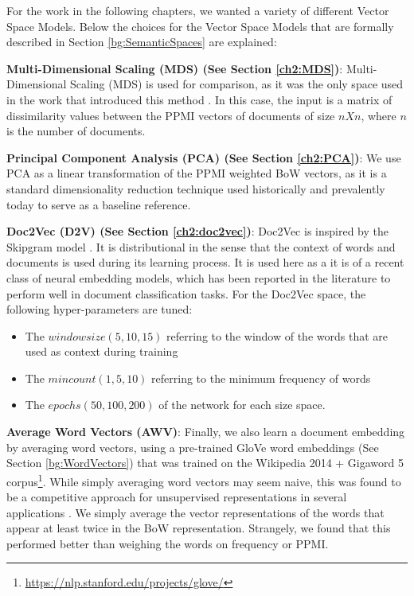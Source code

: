 For the work in the following chapters, we wanted a variety of different Vector Space Models. Below the choices for the Vector Space Models that are formally described in Section \ref{bg:SemanticSpaces} are explained:

\textbf{Multi-Dimensional Scaling (MDS) (See Section \ref{ch2:MDS})}:  Multi-Dimensional Scaling (MDS) is used for comparison, as it was the only space used in the work that introduced this method \cite{derracAIJ}. In this case, the input is a matrix of dissimilarity values between the PPMI vectors of documents of size  $n X n$, where $n$ is the number of documents.  %

\textbf{Principal Component Analysis (PCA) (See Section \ref{ch2:PCA})}: We use PCA as a linear transformation of the PPMI weighted BoW vectors, as it is a standard dimensionality reduction technique used historically and prevalently today to serve as a baseline reference.

\textbf{Doc2Vec (D2V) (See Section \ref{ch2:doc2vec})}: Doc2Vec is inspired by the Skipgram model \cite{DBLP:conf/icml/LeM14}.  It is distributional in the sense that the context of words and documents is used during its learning process. It is used here as a it is of a recent class of neural embedding models, which has been reported in the literature to perform well in document classification tasks. For the Doc2Vec space, the following hyper-parameters are tuned: 

\begin{itemize}
	\item The ${window size} (5, 10, 15)$ referring to the  window of the words that are used as context during training 
	\item The ${min count} (1, 5, 10)$ referring to the minimum frequency of words  
	\item The ${epochs} (50, 100, 200)$ of the network for each size space. 
\end{itemize}



\textbf{Average Word Vectors (AWV)}: Finally, we also learn a document embedding by averaging word vectors, using a pre-trained GloVe word embeddings (See Section \ref{bg:WordVectors}) that was trained on the Wikipedia 2014 + Gigaword 5 corpus\footnote{\url{https://nlp.stanford.edu/projects/glove/}}. While simply averaging word vectors may seem naive, this was found to be a competitive approach for unsupervised representations in several applications \cite{DBLP:conf/naacl/HillCK16}. We simply average the vector representations of the words that appear at least twice in the BoW representation. Strangely, we found that this performed better than weighing the words on frequency or PPMI.

